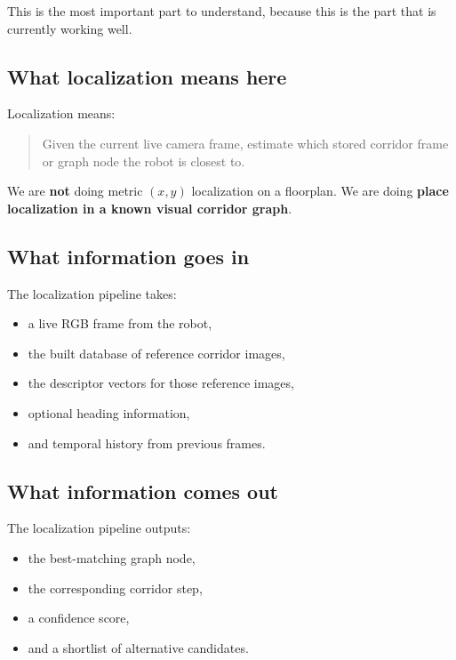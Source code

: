 \documentclass[11pt,a4paper]{article}
\begin{document}
This is the most important part to understand, because this is the part that is
currently working well.

\subsection{What localization means here}

Localization means:

\begin{quote}
Given the current live camera frame, estimate which stored corridor frame or
graph node the robot is closest to.
\end{quote}

We are \textbf{not} doing metric $(x, y)$ localization on a floorplan.
We are doing \textbf{place localization in a known visual corridor graph}.

\subsection{What information goes in}

The localization pipeline takes:

\begin{itemize}[nosep]
  \item a live RGB frame from the robot,
  \item the built database of reference corridor images,
  \item the descriptor vectors for those reference images,
  \item optional heading information,
  \item and temporal history from previous frames.
\end{itemize}

\subsection{What information comes out}

The localization pipeline outputs:

\begin{itemize}[nosep]
  \item the best-matching graph node,
  \item the corresponding corridor step,
  \item a confidence score,
  \item and a shortlist of alternative candidates.
\end{itemize}
\end{document}
